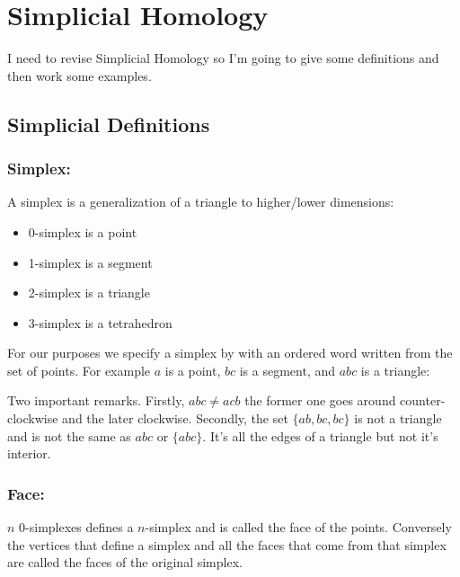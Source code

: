 
\section{Simplicial Homology}
I need to revise Simplicial Homology so I'm going to give some definitions and then work some examples.

\subsection{Simplicial Definitions}

\subsubsection{Simplex:}
A simplex is a generalization of a triangle to higher/lower dimensions:

\begin{itemize}
	\item 0-simplex is a point
	\item 1-simplex is a segment
	\item 2-simplex is a triangle
	\item 3-simplex is a tetrahedron
\end{itemize}

For our purposes we specify a simplex by with an ordered word written from the set of points.
For example $a$ is a point, $bc$ is a segment, and $abc$ is a triangle:
\begin{center}
\end{center}
Two important remarks.
Firstly, $abc\neq acb$ the former one goes around counter-clockwise and the later clockwise.
Secondly, the set $\{ab,bc,bc\}$ is not a triangle and is not the same as $abc$ or $\{abc\}$.
It's all the edges of a triangle but not it's interior.

\subsubsection{Face:}
$n$ 0-simplexes defines a $n$-simplex and is called the face of the points.
Conversely the vertices that define a simplex and all the faces that come from that simplex are called the faces of the original simplex.

